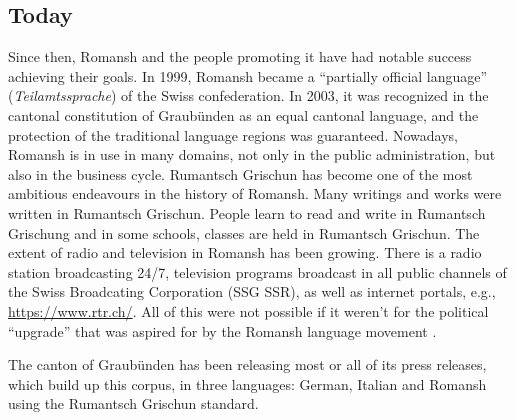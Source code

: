 \subsection{Today}
Since then, Romansh and the people promoting it have had notable success achieving their goals. 
In 1999, Romansh became a \enquote{partially official language} (\emph{Teilamtssprache}) of the Swiss confederation. 
In 2003, it was recognized in the cantonal constitution of Graubünden as an equal cantonal language, and the protection of the traditional language regions was guaranteed.
Nowadays, Romansh is in use in many domains, not only in the public administration, but also in the business cycle. 
Rumantsch Grischun has become one of the most ambitious endeavours in the history of Romansh. 
Many writings and works were written in Rumantsch Grischun. 
People learn to read and write in Rumantsch Grischung and in some schools, classes are held in Rumantsch Grischun. 
The extent of radio and television in Romansh has been growing. 
There is a radio station broadcasting 24/7, television programs broadcast in all public channels of the Swiss Broadcating Corporation (SSG SSR), as well as  internet portals, e.g., \url{https://www.rtr.ch/}. All of this were not possible if it weren't for the political \enquote{upgrade} that was aspired for by the Romansh language movement \autocite{cathomas2012}.

The canton of Graubünden has been releasing most or all of its press releases, which build up this corpus, in three languages: German, Italian and Romansh using the Rumantsch Grischun standard.




